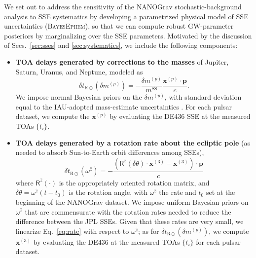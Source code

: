 \documentclass{aastex63}
\begin{document}
We set out to address the sensitivity of the NANOGrav stochastic-background analysis to SSE systematics by developing a parametrized physical model of SSE uncertainties (\textsc{BayesEphem}), so that we can compute robust GW-parameter posteriors by marginalizing over the SSE parameters. 
Motivated by the discussion of Secs.\ \ref{sec:sses} and \ref{sec:systematics}, we include the following components:
%
\begin{itemize} %
%
\item \textbf{TOA delays generated by corrections to the masses} of Jupiter, Saturn, Uranus, and Neptune, modeled as \cite{2010ApJ...720L.201C}
%
\begin{equation}
\label{eq:massperturb}
    \delta t_{\mathrm{R}\odot}(\delta m^{(p)}) = -\frac{\delta m^{(p)}}{m^\mathrm{SS}} \frac{\mathbf{x}^{(p)} \cdot \mathbf{p}}{c}.
\end{equation}
%
We impose normal Bayesian priors on the $\delta m^{(p)}$, with standard deviation equal to the IAU-adopted mass-estimate uncertainties \citep{iaumasses}. For each pulsar dataset, we compute the $\mathbf{x}^{(p)}$ by evaluating the DE436 SSE at the measured TOAs $\{t_i\}$.
%
\item \textbf{TOA delays generated by a rotation rate about the ecliptic pole} (as needed to absorb Sun-to-Earth orbit differences among SSEs),
\begin{equation}
\label{eq:rate}
    \delta t_{\mathrm{R}\odot}(\omega^{\hat{z}}) =
    -\frac{(\mathsf{R}^{\hat{z}}(\delta \theta) \cdot \mathbf{x}^{(3)} - \mathbf{x}^{(3)}) \cdot \mathbf{p}}{c} 
\end{equation}
%
where $\mathsf{R}^{\hat{z}}(\cdot)$ is the appropriately oriented rotation matrix, and $\delta \theta = \omega^{\hat{z}} (t - t_0)$ is the rotation angle, with $\omega^{\hat{z}}$ the rate and $t_0$ set at the beginning of the NANOGrav dataset.
We impose uniform Bayesian priors on $\omega^{\hat{z}}$ that are commensurate with the rotation rates needed to reduce the difference between the JPL SSEs. 
Given that these rates are very small, we linearize Eq.\ \eqref{eq:rate} with respect to $\omega^{\hat{z}}$; as for $\delta t_{\mathrm{R}\odot}(\delta m^{(p)})$, we compute $\mathbf{x}^{(3)}$ by evaluating the DE436 at the measured TOAs $\{t_i\}$ for each pulsar dataset.


\end{itemize}
\end{document}

